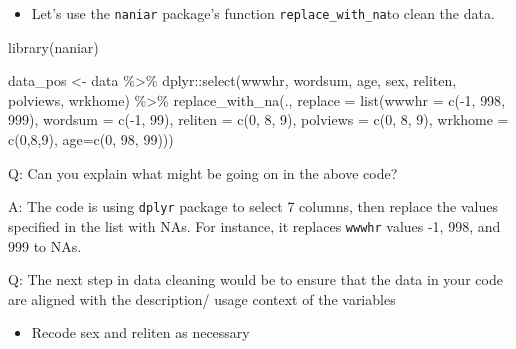 \documentclass[
  letterpaper,
  DIV=11,
  numbers=noendperiod]{scrartcl}
\newenvironment{Shaded}{\begin{snugshade}}{\end{snugshade}}
\newcommand{\AttributeTok}[1]{\textcolor[rgb]{0.40,0.45,0.13}{#1}}
\newcommand{\DecValTok}[1]{\textcolor[rgb]{0.68,0.00,0.00}{#1}}
\newcommand{\FunctionTok}[1]{\textcolor[rgb]{0.28,0.35,0.67}{#1}}
\newcommand{\NormalTok}[1]{\textcolor[rgb]{0.00,0.23,0.31}{#1}}
\newcommand{\OtherTok}[1]{\textcolor[rgb]{0.00,0.23,0.31}{#1}}
\newcommand{\SpecialCharTok}[1]{\textcolor[rgb]{0.37,0.37,0.37}{#1}}
\providecommand{\tightlist}{%
  \setlength{\itemsep}{0pt}\setlength{\parskip}{0pt}}\usepackage{longtable,booktabs,array}
\begin{document}
\begin{itemize}
\tightlist
\item
  Let's use the \texttt{naniar} package's function
  \texttt{replace\_with\_na}to clean the data.
\end{itemize}

\begin{Shaded}
\begin{Highlighting}[]
\FunctionTok{library}\NormalTok{(naniar)}

\NormalTok{data\_pos }\OtherTok{\textless{}{-}}\NormalTok{ data }\SpecialCharTok{\%\textgreater{}\%}
\NormalTok{  dplyr}\SpecialCharTok{::}\FunctionTok{select}\NormalTok{(wwwhr, wordsum, age, sex, reliten, polviews, wrkhome) }\SpecialCharTok{\%\textgreater{}\%}
\FunctionTok{replace\_with\_na}\NormalTok{(.,}
             \AttributeTok{replace =} \FunctionTok{list}\NormalTok{(}\AttributeTok{wwwhr =} \FunctionTok{c}\NormalTok{(}\SpecialCharTok{{-}}\DecValTok{1}\NormalTok{, }\DecValTok{998}\NormalTok{, }\DecValTok{999}\NormalTok{),}
                          \AttributeTok{wordsum =} \FunctionTok{c}\NormalTok{(}\SpecialCharTok{{-}}\DecValTok{1}\NormalTok{, }\DecValTok{99}\NormalTok{),}
                          \AttributeTok{reliten =} \FunctionTok{c}\NormalTok{(}\DecValTok{0}\NormalTok{, }\DecValTok{8}\NormalTok{, }\DecValTok{9}\NormalTok{), }
             \AttributeTok{polviews =} \FunctionTok{c}\NormalTok{(}\DecValTok{0}\NormalTok{, }\DecValTok{8}\NormalTok{, }\DecValTok{9}\NormalTok{), }
             \AttributeTok{wrkhome =} \FunctionTok{c}\NormalTok{(}\DecValTok{0}\NormalTok{,}\DecValTok{8}\NormalTok{,}\DecValTok{9}\NormalTok{), }
             \AttributeTok{age=}\FunctionTok{c}\NormalTok{(}\DecValTok{0}\NormalTok{, }\DecValTok{98}\NormalTok{, }\DecValTok{99}\NormalTok{)))}
\end{Highlighting}
\end{Shaded}

Q: Can you explain what might be going on in the above code?

A: The code is using \texttt{dplyr} package to select 7 columns, then
replace the values specified in the list with NAs. For instance, it
replaces \texttt{wwwhr} values -1, 998, and 999 to NAs.

Q: The next step in data cleaning would be to ensure that the data in
your code are aligned with the description/ usage context of the
variables

\begin{itemize}
\tightlist
\item
  Recode sex and reliten as necessary
\end{itemize}
\end{document}
